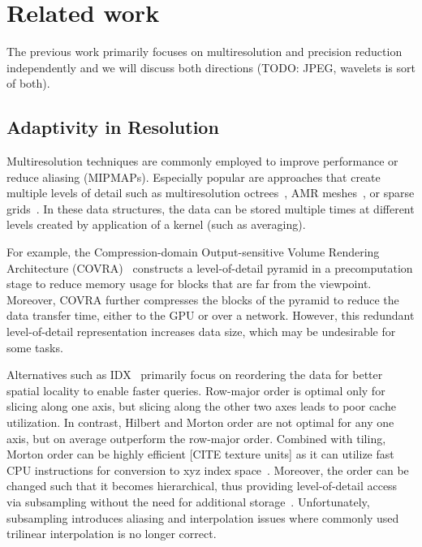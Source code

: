 \section{Related work}

The previous work primarily focuses on multiresolution and precision
reduction independently and we will discuss both directions
(TODO: JPEG, wavelets is sort of both).


\subsection{Adaptivity in Resolution}
Multiresolution techniques are commonly employed to improve performance or
reduce aliasing (MIPMAPs).
Especially popular are approaches that create
multiple levels of detail
such as multiresolution octrees~\cite{multires_octree1999},
AMR meshes~\cite{amr1989}, or sparse grids~\cite{vdb2013, spgrid2014}. In these data structures,
the data can be stored multiple times at different levels created by application of a kernel
(such as averaging). 


For example, the Compression-domain Output-sensitive Volume Rendering Architecture (COVRA)~\cite{covra2012}
constructs a level-of-detail pyramid in a precomputation stage to reduce memory usage for blocks that
are far from the viewpoint. Moreover, COVRA further compresses the blocks of
the pyramid to reduce the data transfer time, either to the GPU or over a
network. However, this redundant level-of-detail representation increases
data size, which may be undesirable for some tasks.

Alternatives such as IDX~\cite{idx2001} primarily focus on reordering the data for better spatial locality to enable faster queries. Row-major order is optimal only for slicing
along one axis, but slicing along the other two axes leads to poor cache
utilization. In contrast, Hilbert
and Morton order are not optimal for any one axis, but on average outperform
the row-major
order. Combined with tiling, Morton order can be highly efficient [CITE texture units] as
it can utilize fast CPU instructions for conversion to xyz index space~\cite{spgrid2014}.
Moreover, the order can be changed such that it becomes hierarchical, thus providing
level-of-detail access via subsampling without the need for additional storage~\cite{idx2001}. Unfortunately,
subsampling introduces aliasing and interpolation issues where commonly used trilinear interpolation
is no longer correct.

